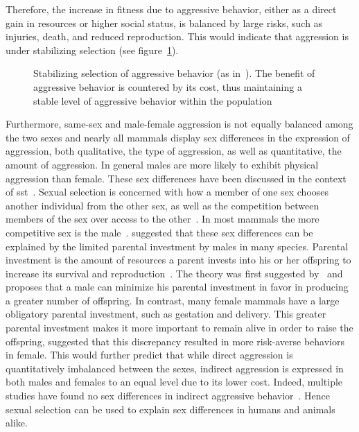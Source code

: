 Therefore, the increase in fitness due to aggressive behavior, either as a direct gain in resources or higher social status, is balanced by large risks, such as injuries, death, and reduced reproduction.
This would indicate that aggression is under stabilizing selection (see figure~\ref{fig:stab}).

\begin{figure}[hp]
	\centering
	\scalebox{0.6}{}
  \caption[Stabilizing Selection of Aggressive Behavior]{Stabilizing selection of aggressive behavior (as in~\citet{Anholt2012}).
  The benefit of aggressive behavior is countered by its cost, thus maintaining a stable level of aggressive behavior within the population}\label{fig:stab}
\end{figure}

Furthermore, same-sex and male-female aggression is not equally balanced among the two sexes and nearly all mammals display sex differences in the expression of aggression, both
qualitative, the type of aggression, as well as quantitative, the amount of aggression.
In general males are more likely to exhibit physical aggression than female.
These sex differences have been discussed in the context of \acrfull{sst}~\cite{Archer2004,Anderson2002,Archer2009}. 
Sexual selection is concerned with how a member of one sex chooses another individual from the other sex, as well as the competition between members of the sex over access to the other~\cite{Darwin1859}.
In most mammals the more competitive sex is the male~\cite{Archer2009}. 
\citet{Trivers1972} suggested that these sex differences can be explained by the limited parental investment by males in many species.
Parental investment is the amount of resources a parent invests into his or her offspring to increase its survival and reproduction~\cite{Archer2009}.
The theory was first suggested by~\citet{0198504403} and proposes that a male can minimize his parental investment in favor in producing a greater number of offspring.
In contrast, many female mammals have a large obligatory parental investment, such as gestation and delivery.
This greater parental investment makes it more important to remain alive in order to raise the offspring,
\citet{Campbell1999} suggested that this discrepancy resulted in more risk-averse behaviors in female.
This would further predict that while direct aggression is quantitatively imbalanced between the sexes, indirect aggression is expressed in both males and females to an equal level due to its lower cost.
Indeed, multiple studies have found no sex differences in indirect aggressive behavior~\cite{NoelCard2008}.
Hence sexual selection can be used to explain sex differences in humans and animals alike.

